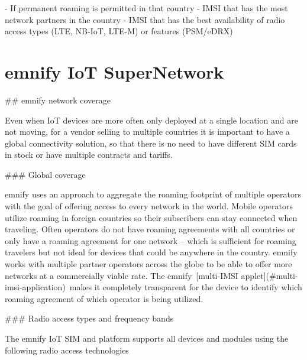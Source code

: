 \documentclass[11pt, oneside]{article}   	%
\newcommand{\addspace}{\vspace{2mm}}
\begin{document}
\addspace
\begin{markdown}
- If permanent roaming is permitted in that country
- IMSI that has the most network partners in the country
- IMSI that has the best availability of radio access types (LTE, NB-IoT, LTE-M) or features (PSM/eDRX)
\end{markdown}
\addspace

\section{emnify IoT SuperNetwork}

\begin{markdown}

## emnify network coverage

Even when IoT devices are more often only deployed at a single location and are not moving, for a vendor selling to multiple countries it is important to have a global connectivity solution, so that there is no need to have different SIM cards in stock or have multiple contracts and tariffs.

### Global coverage

emnify uses an approach to aggregate the roaming footprint of multiple operators with the goal of offering access to every network in the world.
Mobile operators utilize roaming in foreign countries so their subscribers can stay connected when traveling.
Often operators do not have roaming agreements with all countries or only have a roaming agreement for one network – which is sufficient for roaming travelers but not ideal for devices that could be anywhere in the country.
emnify works with multiple partner operators across the globe to be able to offer more networks at a commercially viable rate.
The emnify [multi-IMSI applet](#multi-imsi-application) makes it completely transparent for the device to identify which roaming agreement of which operator is being utilized.

### Radio access types and frequency bands

The emnify IoT SIM and platform supports all devices and modules using the following radio access technologies
\end{markdown}
\addspace
{}
\end{document}
